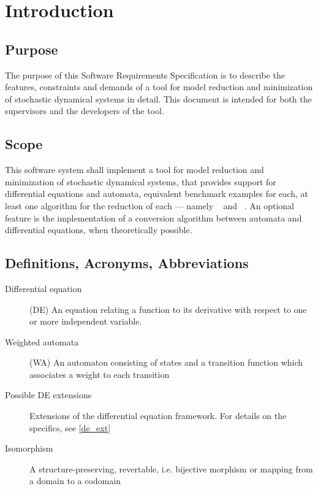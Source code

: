     \section{Introduction}
        \subsection{Purpose}
                The purpose of this Software Requirements Specification is to describe the features, constraints and demands of a tool for model reduction and minimization of stochastic dynamical systems in detail. This document is intended for both the supervisors and the developers of the tool.
        \subsection{Scope}
                This software system shall implement a tool for model reduction and minimization of stochastic dynamical systems, that provides support for differential equations and automata, equivalent benchmark examples for each, at least one algorithm for the reduction of each --- namely ~\autocite{Kiefer2013OnTC} and ~\autocite{Cardelli2017MaximalAO}. An optional feature is the implementation of a conversion algorithm between automata and differential equations, when theoretically possible.

        \subsection{Definitions, Acronyms, Abbreviations}
        \begin{description}
         \item[Differential equation] (DE) An equation relating a function to its derivative with respect to one or more independent variable. \\
         \item[Weighted automata] (WA) An automaton consisting of states and a transition function which associates a weight to each transition \\
         \item[Possible DE extensions] Extensions of the differential equation framework. For details on the specifics, see \cref{de_ext} \\
         \item[Isomorphism] A structure-preserving, revertable, i.e. bijective morphism or mapping from a domain to a codomain
        \end{description}       
        
